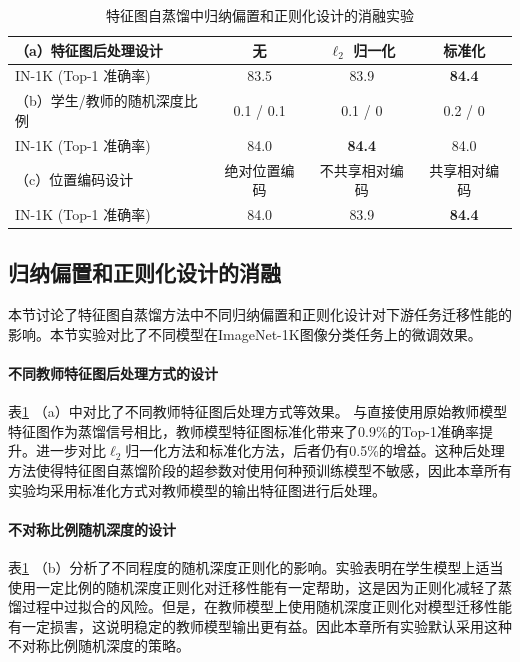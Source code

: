 \begin{table}
    \centering
    \caption{
    特征图自蒸馏中归纳偏置和正则化设计的消融实验}
    \begin{tabular}{lccc}
        \toprule
        （a）特征图后处理设计 & 无 & $\ell_2$ 归一化 & 标准化 \\
        \midrule
        IN-1K (Top-1 准确率) & 83.5 & 83.9 & \textbf{84.4} \\
        \midrule
        （b）学生/教师的随机深度比例 & 0.1 / 0.1 & 0.1 / 0 & 0.2 / 0  \\
        \midrule
        IN-1K (Top-1 准确率) & 84.0 & \textbf{84.4} & 84.0 \\
        \midrule
        （c）位置编码设计 & 绝对位置编码 & 不共享相对编码 & 共享相对编码 \\
        \midrule
        IN-1K (Top-1 准确率) & 84.0 & 83.9 & \textbf{84.4} \\
        \bottomrule
    \end{tabular}
    \label{tab:fd-ablation_tricks}
\end{table}

\subsection{归纳偏置和正则化设计的消融}
\label{sec:fd-exp-detail}
本节讨论了特征图自蒸馏方法中不同归纳偏置和正则化设计对下游任务迁移性能的影响。本节实验对比了不同模型在ImageNet-1K图像分类任务上的微调效果。

\paragraph{不同教师特征图后处理方式的设计} 表\ref{tab:fd-ablation_tricks} （a）中对比了不同教师特征图后处理方式等效果。
与直接使用原始教师模型特征图作为蒸馏信号相比，教师模型特征图标准化带来了0.9\%的Top-1准确率提升。进一步对比$\ell_{2}$归一化方法和标准化方法，后者仍有0.5\%的增益。这种后处理方法使得特征图自蒸馏阶段的超参数对使用何种预训练模型不敏感，因此本章所有实验均采用标准化方式对教师模型的输出特征图进行后处理。

\paragraph{不对称比例随机深度的设计} 表\ref{tab:fd-ablation_tricks} （b）分析了不同程度的随机深度正则化的影响。实验表明在学生模型上适当使用一定比例的随机深度正则化对迁移性能有一定帮助，这是因为正则化减轻了蒸馏过程中过拟合的风险。但是，在教师模型上使用随机深度正则化对模型迁移性能有一定损害，这说明稳定的教师模型输出更有益。因此本章所有实验默认采用这种不对称比例随机深度的策略。

